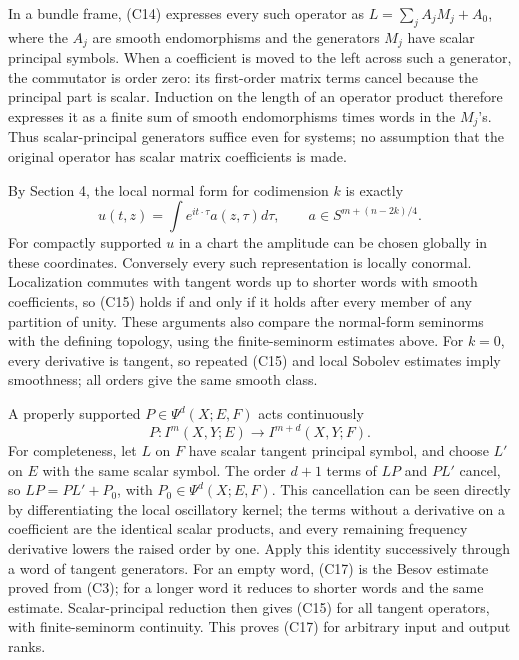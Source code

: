 \documentclass[
  11pt,
]{article}
\makeatletter
\let\ReaderOriginalAnchorStart\hyper@anchorstart
\let\ReaderOriginalAnchorEnd\hyper@anchorend
\let\ReaderPendingAliases\@empty
\def\ReaderArmAliases#1{\gdef\ReaderPendingAliases{#1}}
\def\hyper@anchorstart#1{\ReaderIfNativeAnchorTF{#1}{\ReaderPendingAliases\global\let\ReaderPendingAliases\@empty}{}\ReaderOriginalAnchorStart{#1}}
\makeatother
\begin{document}
In a bundle frame, (C14) expresses every such operator as
\(L=\sum_j A_jM_j+A_0\), where the \(A_j\) are smooth endomorphisms and
the generators \(M_j\) have scalar principal symbols. When a coefficient
is moved to the left across such a generator, the commutator is order
zero: its first-order matrix terms cancel because the principal part is
scalar. Induction on the length of an operator product therefore
expresses it as a finite sum of smooth endomorphisms times words in the
\(M_j\)'s. Thus scalar-principal generators suffice even for systems; no
assumption that the original operator has scalar matrix coefficients is
made.

By Section 4, the local normal form for codimension \(k\) is exactly \[
u(t,z)=\int e^{it\cdot\tau}a(z,\tau)d\tau,
\qquad a\in S^{m+(n-2k)/4}.
\tag{C16}
\] For compactly supported \(u\) in a chart the amplitude can be chosen
globally in these coordinates. Conversely every such representation is
locally conormal. Localization commutes with tangent words up to shorter
words with smooth coefficients, so (C15) holds if and only if it holds
after every member of any partition of unity. These arguments also
compare the normal-form seminorms with the defining topology, using the
finite-seminorm estimates above. For \(k=0\), every derivative is
tangent, so repeated (C15) and local Sobolev estimates imply smoothness;
all orders give the same smooth class.

A properly supported \(P\in\Psi^d(X;E,F)\) acts continuously \[
P:I^m(X,Y;E)\longrightarrow I^{m+d}(X,Y;F).
\tag{C17}
\] For completeness, let \(L\) on \(F\) have scalar tangent principal
symbol, and choose \(L'\) on \(E\) with the same scalar symbol. The
order \(d+1\) terms of \(LP\) and \(PL'\) cancel, so \(LP=PL'+P_0\),
with \(P_0\in\Psi^d(X;E,F)\). This cancellation can be seen directly by
differentiating the local oscillatory kernel; the terms without a
derivative on a coefficient are the identical scalar products, and every
remaining frequency derivative lowers the raised order by one. Apply
this identity successively through a word of tangent generators. For an
empty word, (C17) is the Besov estimate proved from (C3); for a longer
word it reduces to shorter words and the same estimate. Scalar-principal
reduction then gives (C15) for all tangent operators, with
finite-seminorm continuity. This proves (C17) for arbitrary input and
output ranks.

\ReaderArmAliases{\ReaderOriginalAnchorStart{AN03-CN-006}\ReaderOriginalAnchorEnd\begingroup\expandafter\def\csname @currentHref\endcsname{AN03-CN-006}\label{AN03-CN-006}\endgroup\ReaderOriginalAnchorStart{an03-cn-006-the-intrinsic-principal-symbol-and-its-normalization}\ReaderOriginalAnchorEnd\begingroup\expandafter\def\csname @currentHref\endcsname{an03-cn-006-the-intrinsic-principal-symbol-and-its-normalization}\label{an03-cn-006-the-intrinsic-principal-symbol-and-its-normalization}\endgroup\ReaderOriginalAnchorStart{6-the-intrinsic-principal-symbol-and-its-normalization}\ReaderOriginalAnchorEnd\begingroup\expandafter\def\csname @currentHref\endcsname{6-the-intrinsic-principal-symbol-and-its-normalization}\label{6-the-intrinsic-principal-symbol-and-its-normalization}\endgroup\ReaderOriginalAnchorStart{the-intrinsic-principal-symbol-and-its-normalization}\ReaderOriginalAnchorEnd}
\end{document}
